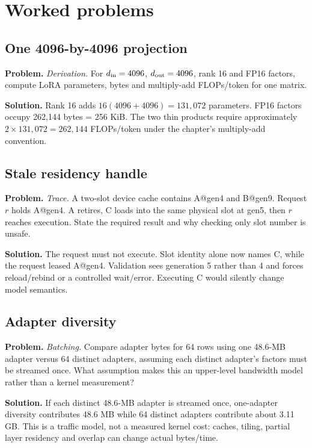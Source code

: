 \section{Worked problems}

\subsection{One 4096-by-4096 projection}
\textbf{Problem.} \emph{Derivation.} For $d_{\rm in}=4096$, $d_{\rm out}=4096$, rank 16 and FP16
factors, compute LoRA parameters, bytes and multiply-add FLOPs/token for one matrix.

\textbf{Solution.} Rank 16 adds $16(4096+4096)=131{,}072$ parameters. FP16 factors occupy
262,144 bytes = 256 KiB. The two thin products require approximately
$2\times131{,}072=262{,}144$ FLOPs/token under the chapter's multiply-add convention.

\subsection{Stale residency handle}
\textbf{Problem.} \emph{Trace.} A two-slot device cache contains A@gen4 and B@gen9. Request $r$
holds A@gen4. A retires, C loads into the same physical slot at gen5, then $r$ reaches
execution. State the required result and why checking only slot number is unsafe.

\textbf{Solution.} The request must not execute. Slot identity alone now names C, while the request
leased A@gen4. Validation sees generation 5 rather than 4 and forces reload/rebind or
a controlled wait/error. Executing C would silently change model semantics.

\subsection{Adapter diversity}
\textbf{Problem.} \emph{Batching.} Compare adapter bytes for 64 rows using one 48.6-MB adapter
versus 64 distinct adapters, assuming each distinct adapter's factors must be streamed
once. What assumption makes this an upper-level bandwidth model rather than a kernel
measurement?

\textbf{Solution.} If each distinct 48.6-MB adapter is streamed once, one-adapter diversity contributes
48.6 MB while 64 distinct adapters contribute about 3.11 GB. This is a traffic model,
not a measured kernel cost: caches, tiling, partial layer residency and overlap can
change actual bytes/time.

